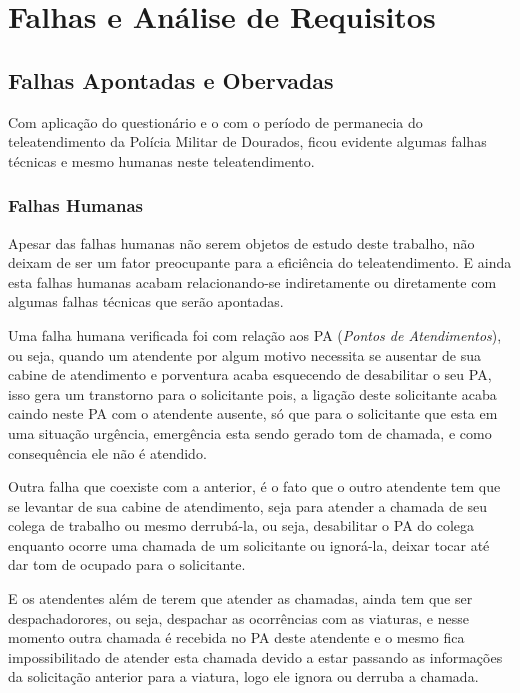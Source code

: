 
\chapter{Falhas e Análise de Requisitos} %
\section{Falhas Apontadas e Obervadas}
Com aplicação do questionário e o com o período de permanecia do teleatendimento da Polícia Militar de Dourados, ficou evidente algumas falhas técnicas e mesmo humanas neste teleatendimento.

\subsection{Falhas Humanas}
Apesar das falhas humanas não serem objetos de estudo deste trabalho, não deixam de ser um fator preocupante para a eficiência do teleatendimento. E ainda esta falhas humanas acabam relacionando-se indiretamente ou diretamente com algumas falhas técnicas que serão apontadas.

Uma falha humana verificada foi com relação aos PA (\textit{Pontos de Atendimentos}), ou seja, quando um atendente por algum motivo necessita se ausentar de sua cabine de atendimento e porventura acaba esquecendo de desabilitar o seu PA, isso gera um transtorno para o solicitante pois, a ligação deste solicitante acaba caindo neste PA com o atendente ausente, só que para o solicitante que esta em uma situação urgência, emergência esta sendo gerado tom de chamada, e como consequência ele não é atendido.

Outra falha que coexiste com a anterior, é o fato que o outro atendente tem que se levantar de sua cabine de atendimento, seja para atender a chamada de seu colega de trabalho ou mesmo derrubá-la, ou seja, desabilitar o PA do colega enquanto ocorre uma chamada de um solicitante ou ignorá-la, deixar tocar até dar tom de ocupado para o solicitante.

E os atendentes além de terem que atender as chamadas, ainda tem que ser despachadorores, ou seja, despachar as ocorrências com as viaturas, e nesse momento outra chamada é recebida no PA deste atendente e o mesmo fica impossibilitado de atender esta chamada devido a estar passando as informações da solicitação anterior para a viatura, logo ele ignora ou derruba a chamada.

